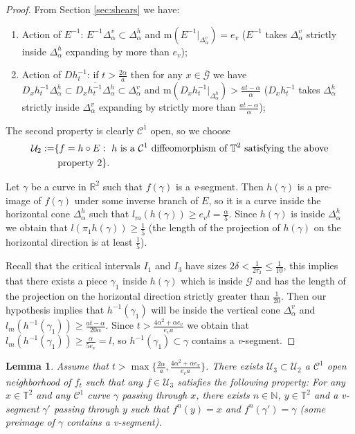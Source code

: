 \documentclass[11pt,letterpaper,reqno]{article}
\newtheorem{lemma}{Lemma}[section]
\newcommand{\conorm}[1]{\mathrm{m}\left(#1\right)}
\newcommand{\N}{\mathbb{N}}
\newcommand{\TT}{\mathbb{T}^2}
\newcommand{\Deh}{\Delta_{\alpha}^h}
\newcommand{\Dev}{\Delta_{\alpha}^v}
\begin{document}
\begin{proof}

From Section \ref{sec:shears} we have:
\begin{enumerate}
\item
Action of $E^{-1}$: $E^{-1}\Dev\subset \Deh$ and $\conorm{E^{-1}|_{\Dev}}=e_v$ ($E^{-1}$ takes $\Dev$ strictly inside $\Deh$ expanding by more than $e_v$);
\item
Action of $Dh_t^{-1}$: if $t>\frac{2\alpha}a$ then for any $x\in\overline{\mathcal G}$ we have $D_xh_t^{-1}\Deh\subset\overline{D_xh_t^{-1}\Deh}\subset \Dev$ and $\conorm{D_xh_t^{-1}|_{\Deh}}>\frac{at-\alpha}{\alpha}$ ($D_xh_t^{-1}$ takes $\Deh$ strictly inside $\Dev$ expanding by strictly more than $\frac{at-\alpha}{\alpha}$);
\end{enumerate}

The second property is clearly $\mathcal C^1$ open, so we choose
\begin{align*}
\mathcal U_2:=&\{f=h\circ E:\ h \hbox{ is a }\mathcal C^1\hbox{ diffeomorphism of }\TT\hbox{ satisfying the above}\\ &\hbox{ property 2}\}.
\end{align*}

Let $\gamma$ be a curve in $\mathbb R^2$ such that $f(\gamma)$ is a \textit{v}-segment. Then $h(\gamma)$ is a pre-image of $f(\gamma)$ under some inverse branch of $E$, so it is a curve inside the horizontal cone $\Delta_{\alpha}^h$ such that $l_m(h(\gamma))\geq e_vl=\frac{\alpha}5$. Since $h(\gamma)$ is inside $\Deh$ we obtain that $l(\pi_1h(\gamma))\geq\frac 15$ (the length of the projection of $h(\gamma)$ on the horizontal direction is at least $\frac 15$).

Recall that the critical intervals $I_1$ and $I_3$ have sizes $2\delta<\frac 1{2\tau_2}\leq \frac 1{10}$, this implies that there exists a piece $\gamma_1$ inside $h(\gamma)$ which is inside $\mathcal G$ and has the length of the projection on the horizontal direction strictly greater than $\frac 1{20}$. Then our hypothesis implies that $h^{-1}(\gamma_1)$ will be inside the vertical cone $\Dev$ and $l_m(h^{-1}(\gamma_1))\geq\frac {at-\alpha}{20\alpha}$. Since $t>\frac{4\alpha^2+\alpha e_v}{e_va}$ we obtain that $l_m(h^{-1}(\gamma_1))\geq\frac {\alpha}{5e_v}=l$, so $h^{-1}(\gamma_1)\subset\gamma$ contains a \textit{v}-segment.
\end{proof}

\begin{lemma}
Assume that $t>\max\{\frac{2\alpha}a,\frac{4\alpha^2+\alpha e_v}{e_va}\}$. There exists $\mathcal U_3\subset\mathcal U_2$ a $\mathcal C^1$ open neighborhood of $f_t$ such that any $f\in \mathcal U_3$ satisfies the following property: For any $x\in\TT$ and any $\mathcal C^1$ curve $\gamma$ passing through $x$, there exists $n\in\N$, $y\in \TT$ and a \textit{v}-segment $\gamma'$ passing through $y$ such that $f^n(y)=x$ and $f^n(\gamma')=\gamma$ (some preimage of $\gamma$ contains a \textit{v}-segment).
\end{lemma}
\end{document}
